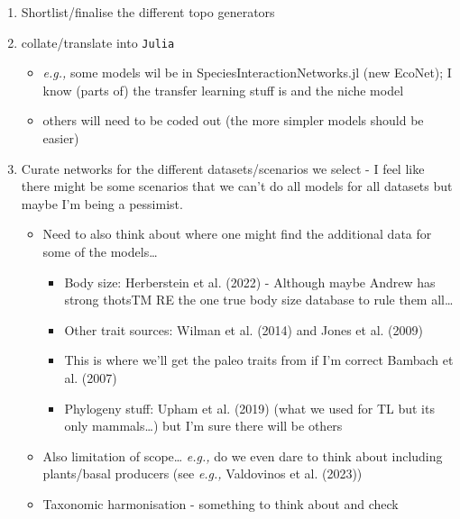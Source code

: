 \documentclass[
]{agujournal2019}
\providecommand{\tightlist}{%
  \setlength{\itemsep}{0pt}\setlength{\parskip}{0pt}}\usepackage{longtable,booktabs,array}
\begin{document}
\begin{enumerate}
\def\labelenumi{\arabic{enumi}.}
\tightlist
\item
  Shortlist/finalise the different topo generators
\item
  collate/translate into \texttt{Julia}

  \begin{itemize}
  \tightlist
  \item
    \emph{e.g.,} some models wil be in SpeciesInteractionNetworks.jl
    (new EcoNet); I know (parts of) the transfer learning stuff is and
    the niche model
  \item
    others will need to be coded out (the more simpler models should be
    easier)
  \end{itemize}
\item
  Curate networks for the different datasets/scenarios we select - I
  feel like there might be some scenarios that we can't do all models
  for all datasets but maybe I'm being a pessimist.

  \begin{itemize}
  \tightlist
  \item
    Need to also think about where one might find the additional data
    for some of the models\ldots{}

    \begin{itemize}
    \tightlist
    \item
      Body size: Herberstein et al. (2022) - Although maybe Andrew has
      strong thotsTM RE the one true body size database to rule them
      all\ldots{}
    \item
      Other trait sources: Wilman et al. (2014) and Jones et al. (2009)
    \item
      This is where we'll get the paleo traits from if I'm correct
      Bambach et al. (2007)
    \item
      Phylogeny stuff: Upham et al. (2019) (what we used for TL but its
      only mammals\ldots) but I'm sure there will be others
    \end{itemize}
  \item
    Also limitation of scope\ldots{} \emph{e.g.,} do we even dare to
    think about including plants/basal producers (see \emph{e.g.,}
    Valdovinos et al. (2023))
  \item
    Taxonomic harmonisation - something to think about and check
  \end{itemize}
\end{enumerate}
\end{document}
